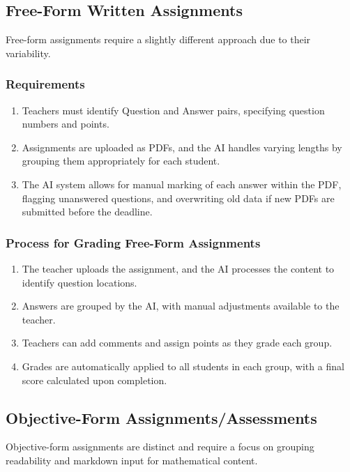 \documentclass[ms,twoside,print]{nuthesis}
\begin{document}
\subsection{Free-Form Written Assignments}

Free-form assignments require a slightly different approach due to their variability.

\subsubsection{Requirements}
\begin{enumerate}
    \item Teachers must identify Question and Answer pairs, specifying question numbers and points.
    \item Assignments are uploaded as PDFs, and the AI handles varying lengths by grouping them appropriately for each student.
    \item The AI system allows for manual marking of each answer within the PDF, flagging unanswered questions, and overwriting old data if new PDFs are submitted before the deadline.
\end{enumerate}

\subsubsection{Process for Grading Free-Form Assignments}
\begin{enumerate}
    \item The teacher uploads the assignment, and the AI processes the content to identify question locations.
    \item Answers are grouped by the AI, with manual adjustments available to the teacher.
    \item Teachers can add comments and assign points as they grade each group.
    \item Grades are automatically applied to all students in each group, with a final score calculated upon completion.
\end{enumerate}

\subsection{Objective-Form Assignments/Assessments}

Objective-form assignments are distinct and require a focus on grouping readability and markdown input for mathematical content.
\end{document}
